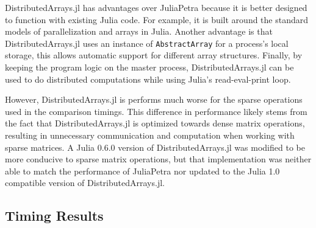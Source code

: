 \documentclass[acmsmall]{acmart}
\newcommand{\snippet}[1]{\lstinline{#1}}
\begin{document}
	DistributedArrays.jl has advantages over JuliaPetra because it is better designed to function with
	existing Julia code.
	For example, it is built around the standard models of parallelization and arrays in Julia.
	Another advantage is that DistributedArrays.jl uses an instance of \snippet{AbstractArray}
	for a process's local storage, this allows automatic support for different array structures.
	Finally, by keeping the program logic on the master process, DistributedArrays.jl can be used to
	do distributed computations while using Julia's read-eval-print loop.
	
	However, DistributedArrays.jl is performs much worse for the sparse operations used in the comparison timings.
	This difference in performance likely stems from the fact that DistributedArrays.jl is optimized towards dense matrix operations, resulting in unnecessary communication and computation when working with sparse matrices.
	A Julia 0.6.0 version of DistributedArrays.jl was modified to be more conducive to sparse matrix operations, but that implementation was neither able to match the performance of JuliaPetra nor updated to the Julia 1.0 compatible version of DistributedArrays.jl.
	
	\subsection{Timing Results}
	\label{sec:timing}
	
\end{document}
